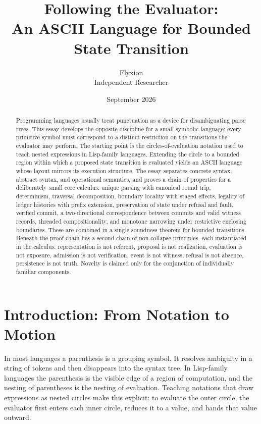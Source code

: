 \documentclass[11pt]{article}
\title{Following the Evaluator:\\An ASCII Language for Bounded State Transition}
\author{Flyxion\\Independent Researcher}
\date{September 2026}
\begin{document}
\maketitle

\begin{abstract}
Programming languages usually treat punctuation as a device for disambiguating parse trees. This essay develops the opposite discipline for a small symbolic language: every primitive symbol must correspond to a distinct restriction on the transitions the evaluator may perform. The starting point is the circles-of-evaluation notation used to teach nested expressions in Lisp-family languages. Extending the circle to a bounded region within which a proposed state transition is evaluated yields an ASCII language whose layout mirrors its execution structure. The essay separates concrete syntax, abstract syntax, and operational semantics, and proves a chain of properties for a deliberately small core calculus: unique parsing with canonical round trip, determinism, traversal decomposition, boundary locality with staged effects, legality of ledger histories with prefix extension, preservation of state under refusal and fault, verified commit, a two-directional correspondence between commits and valid witness records, threaded compositionality, and monotone narrowing under restrictive enclosing boundaries. These are combined in a single soundness theorem for bounded transitions. Beneath the proof chain lies a second chain of non-collapse principles, each instantiated in the calculus: representation is not referent, proposal is not realization, evaluation is not exposure, admission is not verification, event is not witness, refusal is not absence, persistence is not truth. Novelty is claimed only for the conjunction of individually familiar components.
\end{abstract}

\section{Introduction: From Notation to Motion}

In most languages a parenthesis is a grouping symbol. It resolves ambiguity in a string of tokens and then disappears into the syntax tree. In Lisp-family languages the parenthesis is the visible edge of a region of computation, and the nesting of parentheses is the nesting of evaluation. Teaching notations that draw expressions as nested circles make this explicit: to evaluate the outer circle, the evaluator first enters each inner circle, reduces it to a value, and hands that value outward.
\end{document}
